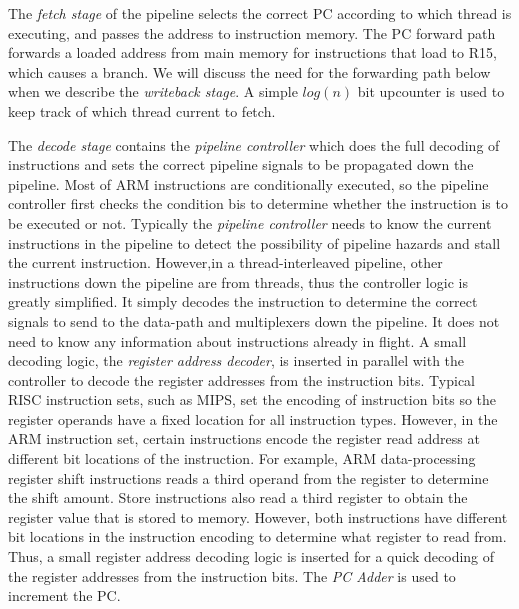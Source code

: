 The \emph{fetch stage} of the pipeline selects the correct PC according to which thread is executing, and passes the address to instruction memory. 
The PC forward path forwards a loaded address from main memory for instructions that load to R15, which causes a branch.
We will discuss the need for the forwarding path below when we describe the \emph{writeback stage}.
A simple $log(n)$ bit upcounter is used to keep track of which thread current to fetch.

The \emph{decode stage} contains the \emph{pipeline controller} which does the full decoding of instructions and sets the correct pipeline signals to be propagated down the pipeline.
Most of ARM instructions are conditionally executed, so the pipeline controller first checks the condition bis to determine whether the instruction is to be executed or not.  
Typically the \emph{pipeline controller} needs to know the current instructions in the pipeline to detect the possibility of pipeline hazards and stall the current instruction.
However,in a thread-interleaved pipeline, other instructions down the pipeline are from threads, thus the controller logic is greatly simplified. 
It simply decodes the instruction to determine the correct signals to send to the data-path and multiplexers down the pipeline.
It does not need to know any information about instructions already in flight. 
A small decoding logic, the \emph{register address decoder}, is inserted in parallel with the controller to decode the register addresses from the instruction bits.  
Typical RISC instruction sets, such as MIPS, set the encoding of instruction bits so the register operands have a fixed location for all instruction types.
However, in the ARM instruction set, certain instructions encode the register read address at different bit locations of the instruction.
For example, ARM data-processing register shift instructions reads a third operand from the register to determine the shift amount.
Store instructions also read a third register to obtain the register value that is stored to memory. 
However, both instructions have different bit locations in the instruction encoding to determine what register to read from.
Thus, a small register address decoding logic is inserted for a quick decoding of the register addresses from the instruction bits.
The \emph{PC Adder} is used to increment the PC.
